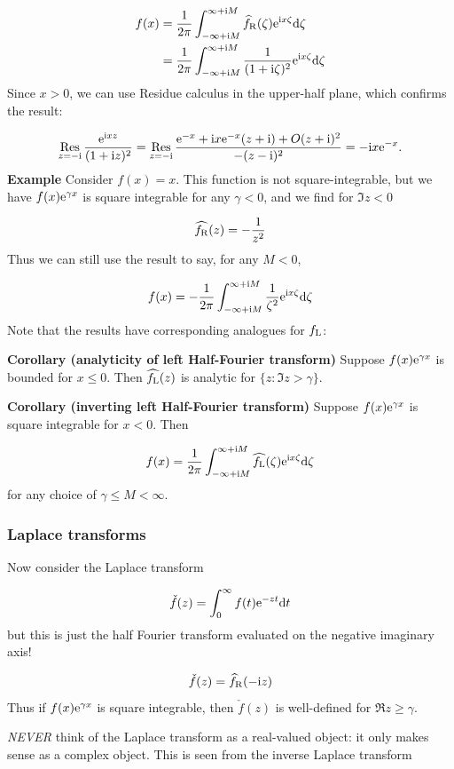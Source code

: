 \documentclass[12pt,a4paper]{article}
\def\D{ {\rm d} }
\def\I{ {\rm i} }
\def\E{ {\rm e} }
\def\fR{ f_{\rm R} }
\def\fL{ f_{\rm L} }
\def\Res_#1{\underset{#1}{\rm Res}\,}
\def\dt{\D t}
\begin{document}
\begin{align*}
f(x) &= {1 \over 2 \pi} \int_{-\infty+\I M}^{\infty +\I M}\widehat\fR(\zeta) \E^{\I x \zeta}\D \zeta \\
     &={1 \over 2 \pi} \int_{-\infty+\I M}^{\infty +\I M}{1 \over (1+\I \zeta)^2} \E^{\I x \zeta}\D \zeta
\end{align*}
Since $x > 0$, we can use Residue calculus in the upper-half plane, which confirms the result:

\[
\Res_{z = -\I} {\E^{\I x z} \over  (1+\I z)^2}  = \Res_{z = -\I} {\E^{- x} + \I x \E^{-x} (z +\I) + O(z+\I)^2 \over  -(z-\I)^2}  = -\I x \E^{-x}.
\]
\textbf{Example} Consider $f(x) = x$.  This function is not square-integrable, but we have  $f(x) \E^{\gamma x}$ is square integrable for any $\gamma < 0$, and we find for $\Im z < 0$

\[
\widehat{\fR}(z) = -{1 \over z^2}
\]
Thus we can still use the result to say, for any $M < 0$, 

\[
f(x) =-{1 \over 2 \pi} \int_{-\infty+\I M}^{\infty +\I M} {1 \over \zeta^2} \E^{\I x \zeta}\D \zeta
\]
Note that the results have corresponding analogues for $\fL$:

\textbf{Corollary (analyticity of left Half-Fourier transform)}   Suppose $f(x) \E^{\gamma x}$  is bounded for $x \leq 0$.  Then $\widehat{\fL}(z)$ is analytic for $\{z : \Im z > \gamma \}$.

\textbf{Corollary  (inverting left Half-Fourier transform)}   Suppose $f(x) \E^{\gamma x}$ is square integrable for $x < 0$. Then 

\[
f(x) = {1 \over 2 \pi} \int_{-\infty + \I M}^{\infty + \I M} \widehat{\fL}(\zeta) \E^{\I x \zeta} \D \zeta
\]
for any choice of $\gamma \leq M < \infty$.

\subsubsection{Laplace transforms}
Now consider the Laplace transform

\[
\check f(z) = \int_0^\infty f(t) \E^{-z t} \dt
\]
but this is just the half Fourier transform evaluated on the negative imaginary axis!

\[
\check f(z) = \widehat\fR (-\I z)
\]
Thus if $f(x) \E^{\gamma x}$ is square integrable, then $\check f(z)$ is well-defined for $\Re z \geq \gamma$.    

\emph{NEVER} think of the Laplace transform as a real-valued object: it only makes sense as a complex object.  This is seen from the inverse Laplace transform
\end{document}

